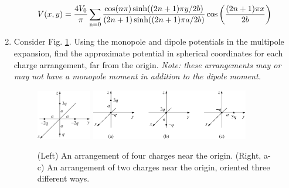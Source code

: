 \documentclass[10pt]{article}
\begin{document}
\begin{enumerate}
\begin{equation}
V(x,y) = \frac{4V_0}{\pi} \sum_{\rm n=0} \frac{\cos(n\pi)\sinh((2n+1)\pi y/2b)}{(2n+1)\sinh((2n+1)\pi a/2b)} \cos\left( \frac{(2n+1)\pi x}{2b}\right)
\end{equation}

\clearpage

\item Consider Fig. \ref{fig:dipoles}.  Using the monopole and dipole potentials in the multipole expansion, find the approximate potential in spherical coordinates for each charge arrangement, far from the origin.  \textit{Note: these arrangements may or may not have a monopole moment in addition to the dipole moment.}
\begin{figure}
\centering
\includegraphics[width=0.225\textwidth]{figures/3_31.jpg} \hspace{1cm}
\includegraphics[width=0.65\textwidth]{figures/3_35.jpg}
\caption{\label{fig:dipoles} (Left) An arrangement of four charges near the origin.  (Right, a-c) An arrangement of two charges near the origin, oriented three different ways.}
\end{figure}


\end{enumerate}
\end{document}
